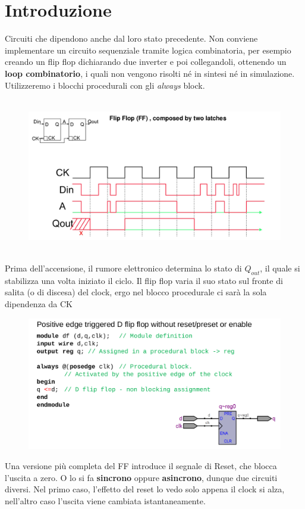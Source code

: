 \documentclass{book}
\begin{document}
    \section{Introduzione}
        Circuiti che dipendono anche dal loro stato precedente. Non conviene 
        implementare un circuito sequenziale tramite logica combinatoria, per esempio 
        creando un flip flop dichiarando due inverter e poi collegandoli, ottenendo un 
        \textbf{loop combinatorio}, i quali non vengono risolti né in sintesi né in 
        simulazione. Utilizzeremo i blocchi procedurali con gli \textit{always} block. \\ \\
        \begin{figure}[h!]
            \centering
            \includegraphics[width=0.5\linewidth]{img/Chapt11img1.png}
        \end{figure} \\
        Prima dell'accensione, il rumore elettronico determina lo stato di $Q_{out}$, il quale si stabilizza una volta iniziato il ciclo. Il flip flop varia il suo stato sul fronte di salita (o di discesa) del clock, ergo nel blocco procedurale ci sarà la sola dipendenza da CK\newpage
        \begin{figure}[h!]
            \centering
            \includegraphics[width=0.75\linewidth]{img/chapt11img2.png}
        \end{figure} 
        Una versione più completa del FF introduce il segnale di Reset, che blocca l'uscita a zero. O lo si fa \textbf{sincrono} oppure \textbf{asincrono}, dunque due circuiti diversi. Nel primo caso, l'effetto del reset lo vedo solo appena il clock si alza, nell'altro caso l'uscita viene cambiata istantaneamente.
\end{document}
